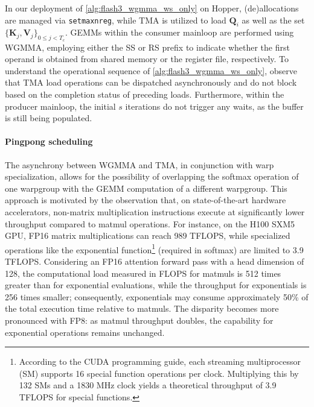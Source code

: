 \begin{enumerate}
In our deployment of \cref{alg:flash3_wgmma_ws_only} on Hopper, (de)allocations are managed via \verb|setmaxnreg|, while TMA is utilized to load $\mathbf{Q}_i$ as well as the set $\{ \mathbf{K}_j, \mathbf{V}_j \}_{0 \leq j < T_c}$. GEMMs within the consumer mainloop are performed using WGMMA, employing either the SS or RS prefix to indicate whether the first operand is obtained from shared memory or the register file, respectively. To understand the operational sequence of \cref{alg:flash3_wgmma_ws_only}, observe that TMA load operations can be dispatched asynchronously and do not block based on the completion status of preceding loads. Furthermore, within the producer mainloop, the initial $s$ iterations do not trigger any waits, as the buffer is still being populated.

\paragraph{Pingpong scheduling} The asynchrony between WGMMA and TMA, in conjunction with warp specialization, allows for the possibility of overlapping the softmax operation of one warpgroup with the GEMM computation of a different warpgroup. This approach is motivated by the observation that, on state-of-the-art hardware accelerators, non-matrix multiplication instructions execute at significantly lower throughput compared to matmul operations. For instance, on the H100 SXM5 GPU, FP16 matrix multiplications can reach 989 TFLOPS, while specialized operations like the exponential function\footnote{According to the CUDA programming guide, each streaming multiprocessor (SM) supports 16 special function operations per clock. Multiplying this by 132 SMs and a 1830 MHz clock yields a theoretical throughput of 3.9 TFLOPS for special functions.} (required in softmax) are limited to 3.9 TFLOPS. Considering an FP16 attention forward pass with a head dimension of 128, the computational load measured in FLOPS for matmuls is 512 times greater than for exponential evaluations, while the throughput for exponentials is 256 times smaller; consequently, exponentials may consume approximately 50\% of the total execution time relative to matmuls. The disparity becomes more pronounced with FP8: as matmul throughput doubles, the capability for exponential operations remains unchanged.


\end{enumerate}
